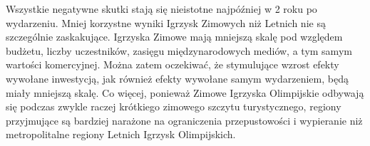 \documentclass[12pt]{article}
\begin{document}
Wszystkie negatywne skutki stają się nieistotne najpóźniej w 2 roku po wydarzeniu. Mniej korzystne wyniki Igrzysk Zimowych niż Letnich nie są szczególnie zaskakujące. Igrzyska Zimowe mają mniejszą skalę pod względem budżetu, liczby uczestników, zasięgu międzynarodowych mediów, a tym samym wartości komercyjnej. Można zatem oczekiwać, że stymulujące wzrost efekty wywołane inwestycją, jak również efekty wywołane samym wydarzeniem, będą miały mniejszą skalę. Co więcej, ponieważ Zimowe Igrzyska Olimpijskie odbywają się podczas zwykle raczej krótkiego zimowego szczytu turystycznego, regiony przyjmujące są bardziej narażone na ograniczenia przepustowości i wypieranie niż metropolitalne regiony Letnich Igrzysk Olimpijskich.\\
\end{document}
